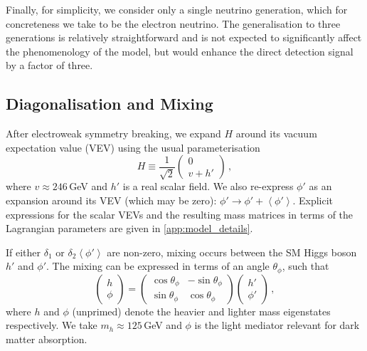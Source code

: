 \documentclass[aps, prd, reprint, nofootinbib, amsmath, amssymb, floatfix]{revtex4-2}
\newcommand{\vev}[1]{\left< #1 \right>}      %
\begin{document}
Finally, for simplicity, we consider only a single neutrino generation, which for concreteness we take to be the electron neutrino. The generalisation to three generations is relatively straightforward and is not expected to significantly affect the phenomenology of the model, but would enhance the direct detection signal by a factor of three.



\subsection{Diagonalisation and Mixing}\label{sec:Diagonalisation}
    
After electroweak symmetry breaking, we expand $H$ around its vacuum expectation value (VEV) using the usual parameterisation
%
\begin{equation}\label{eq:HVEV}
    H \equiv \frac{1}{\sqrt{2}} \begin{pmatrix}0 \\ v + h'\end{pmatrix} \,,
\end{equation}
%
where $v \approx 246$\,GeV and $h'$ is a real scalar field. We also re-express $\phi'$ as an expansion around its VEV (which may be zero): $\phi' \to \phi' + \vev{\phi'}$. Explicit expressions for the scalar VEVs and the resulting mass matrices in terms of the Lagrangian parameters are given in \cref{app:model_details}.

If either $\delta_1$ or $\delta_2 \left<\phi'\right>$ are non-zero, mixing occurs between the SM Higgs boson $h'$ and $\phi'$. The mixing can be expressed in terms of an angle $\theta_\phi$, such that
%
\begin{equation}
    \begin{pmatrix}h \\ \phi\end{pmatrix} =
    \begin{pmatrix}\cos\theta_\phi & -\sin\theta_\phi \\ \sin\theta_\phi & \cos\theta_\phi\end{pmatrix}
    \begin{pmatrix}h' \\ \phi'\end{pmatrix} \,,
\end{equation}
%
where $h$ and $\phi$ (unprimed) denote the heavier and lighter mass eigenstates respectively. We take $m_h \approx 125$\,GeV and $\phi$ is the light mediator relevant for dark matter absorption.
\end{document}
